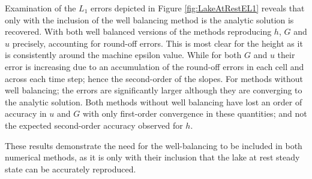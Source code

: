 Examination of the $L_1$ errors depicted in Figure \ref{fig:LakeAtRestEL1} reveals that only with the inclusion of the well balancing method is the analytic solution is recovered. With both well balanced versions of the methods reproducing $h$, $G$ and $u$ precisely, accounting for round-off errors. This is most clear for the height as it is consistently around the machine epsilon value. While for both $G$ and $u$ their error is increasing due to an accumulation of the round-off errors in each cell and across each time step; hence the second-order of the slopes. For methods without well balancing; the errors are significantly larger although they are converging to the analytic solution. Both methods without well balancing have lost an order of accuracy in $u$ and $G$ with only first-order convergence in these quantities; and not the expected second-order accuracy observed for $h$. 

These results demonstrate the need for the well-balancing to be included in both numerical methods, as it is only with their inclusion that the lake at rest steady state can be accurately reproduced. 




